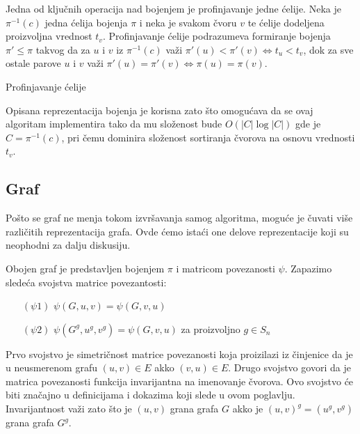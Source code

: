 \documentclass[12pt,oneside]{memoir}
\theoremstyle{definition}
\begin{document}
   Jedna od ključnih operacija nad bojenjem je profinjavanje jedne ćelije. Neka
   je $\pi^{-1}(c)$ jedna ćelija bojenja $\pi$ i neka je svakom čvoru $v$ te
   ćelije dodeljena proizvoljna vrednost $t_v$. Profinjavanje ćelije
   podrazumeva formiranje bojenja $\pi' \leq \pi$ takvog da za $u$ i $v$ iz
   $\pi^{-1}(c)$ važi $\pi'(u) < \pi'(v) \iff t_u < t_v$, dok za sve ostale
   parove $u$ i $v$ važi $\pi'(u) = \pi'(v) \iff \pi(u) = \pi(v)$.

  \begin{algorithm}[H]
	  \caption{Profinjavanje ćelije}
	  \begin{algorithmic}[]
	      \EndFor
		  \State{}
		  \EndProcedure
	  \end{algorithmic}
  \end{algorithm}

  Opisana reprezentacija bojenja je korisna zato što omogućava da se ovaj
  algoritam implementira tako da mu složenost bude $O(|C| \log |C|)$ gde je $C
  = \pi^{-1}(c)$, pri čemu dominira složenost sortiranja čvorova na osnovu
  vrednosti $t_v$.

  \subsection{Graf}

   Pošto se graf ne menja tokom izvršavanja samog algoritma, moguće je čuvati
   više različitih reprezentacija grafa. Ovde ćemo istaći one delove
   reprezentacije koji su neophodni za dalju diskusiju.

   Obojen graf je predstavljen bojenjem $\pi$ i matricom povezanosti $\psi$.
   Zapazimo sledeća svojstva matrice povezantosti:
   \begin{itemize}
	   \item[$(\psi1)$] $\psi(G, u, v) = \psi(G, v, u)$
	   \item[$(\psi2)$] $\psi(G^g, u^g, v^g) = \psi(G, v, u)$ za proizvoljno $g \in S_n$
   \end{itemize}
   Prvo svojstvo je simetričnost matrice povezanosti koja proizilazi iz
   činjenice da je u neusmerenom grafu $(u, v) \in E$ akko $(v, u) \in E$.
   Drugo svojstvo govori da je matrica povezanosti funkcija invarijantna na
   imenovanje čvorova. Ovo svojstvo će biti značajno u definicijama i dokazima
   koji slede u ovom poglavlju. Invarijantnost važi zato što je $(u, v)$ grana
   grafa $G$ akko je $(u, v)^g = (u^g, v^g)$ grana grafa $G^g$.
\end{document}
